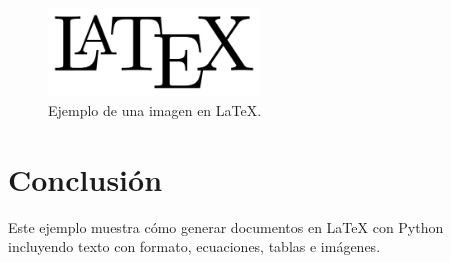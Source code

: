 \documentclass{article}%
\begin{document}
\begin{figure}[h!]%
\centering%
\includegraphics[width=0.5\textwidth]{latex.png}%
\caption{Ejemplo de una imagen en LaTeX.}%
\end{figure}

%
\section{Conclusión}%
\label{sec:Conclusin}%
Este ejemplo muestra cómo generar documentos en LaTeX con Python incluyendo texto con formato, ecuaciones, tablas e imágenes.

%
\end{document}
